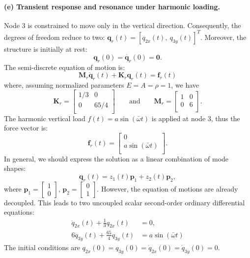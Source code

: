\documentclass[12pt]{article}
\begin{document}
\paragraph*{(e) Transient response and resonance under harmonic loading.}  Node 3 is constrained to move only in the vertical direction. Consequently, the degrees of freedom reduce to two: $\mathbf{q}_r(t)=[q_{2x}(t),\ q_{3y}(t)]^T$. Moreover, the structure is initially at rest:
\[
	\mathbf{q}_r(0) = \dot{\mathbf{q}_r}(0) = \mathbf{0}.
\]
The semi-discrete equation of motion is:
\[
	\mathbf{M}_r \ddot{\mathbf{q}}_r(t) + \mathbf{K}_r \mathbf{q}_r(t) = \mathbf{f}_r(t)
\]
where, assuming normalized parameters \( E = A = \rho = 1 \), we have
\[
	\mathbf{K}_r =\begin{bmatrix}
		1/3 & 0    \\
		0   & 65/4 \\
	\end{bmatrix} \qquad\text{and}\qquad \mathbf{M}_r=\begin{bmatrix}
		1 & 0 \\
		0 & 6 \\
	\end{bmatrix}.
\]
The harmonic vertical load \( f(t) = a \sin(\bar{\omega} t) \) is applied at node 3, thus the force vector is:
\[
	\mathbf{f}_r(t) =
	\begin{bmatrix}
		0                      \\
		a \sin(\bar{\omega} t) \\
	\end{bmatrix}.
\]
In general, we should express the solution as a linear combination of mode shapes:
\[
	\mathbf{q}_r(t) = z_1(t) {\mathbf p}_1 + z_2(t) {\mathbf p}_2,
\]
where \( {\mathbf p}_1 = \begin{bmatrix} 1 \\ 0 \end{bmatrix} \), \( {\mathbf p}_2 = \begin{bmatrix} 0 \\ 1 \end{bmatrix} \). However, the equation of motions are already decoupled. This leads to two uncoupled scalar second-order ordinary differential equations:
\begin{align*}
	\ddot{q}_{2x}(t) + \frac{1}{3} q_{2x} (t)     & = 0,                      \\
	6 \ddot{q}_{3y}(t) + \frac{65}{4}  q_{3y} (t) & =  a \sin(\bar{\omega} t)
\end{align*}
The initial conditions are \( q_{2x}(0) =  q_{3y}(0) = \dot{q}_{2x}(0) = \dot{q}_{3y}(0) = 0 \).
\end{document}
